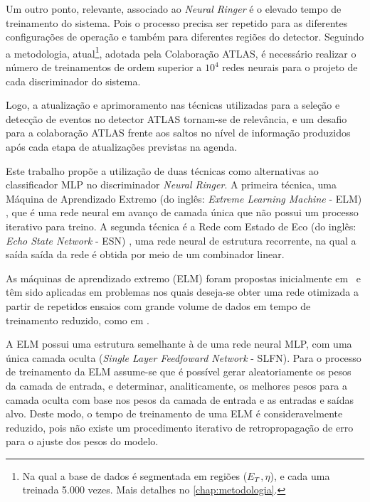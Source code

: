 Um outro ponto, relevante, associado ao \emph{Neural Ringer} é o elevado tempo de treinamento do sistema. Pois o processo precisa ser repetido para as diferentes configurações de operação e também para diferentes regiões do detector. Seguindo a metodologia, atual\footnote{Na qual a base de dados é segmentada em regiões ($E_T\,,\eta$), e cada uma treinada 5.000 vezes. Mais detalhes no \autoref{chap:metodologia}.}, adotada pela Colaboração ATLAS, é necessário realizar o número de treinamentos de ordem superior a $10^4$ redes neurais para o projeto de cada discriminador do sistema. 

Logo, a atualização e aprimoramento nas técnicas utilizadas para a seleção e detecção de eventos no detector ATLAS tornam-se de relevância, e um desafio para a colaboração ATLAS frente aos saltos no nível de informação produzidos após cada etapa de atualizações previstas na agenda.

Este trabalho propõe a utilização de duas técnicas como alternativas ao classificador MLP no discriminador \emph{Neural Ringer}. A primeira técnica, uma Máquina de Aprendizado Extremo (do inglês: \emph{Extreme Learning Machine} - ELM) \cite{huang2006, huang2011, gaohuang2015, huang2015}, que é uma rede neural em avanço de camada única que não possui um processo iterativo para treino. A segunda técnica é a Rede com Estado de Eco (do inglês: \emph{Echo State Network} - ESN) \cite{jaeger2003, jaeger2004, jaeger2010}, uma rede neural de estrutura recorrente, na qual a saída saída da rede é obtida por meio de um combinador linear.


As máquinas de aprendizado extremo (ELM) foram propostas inicialmente em~ e têm sido aplicadas em problemas nos quais deseja-se obter uma rede otimizada a partir de repetidos ensaios com grande volume de dados em tempo de treinamento reduzido, como em  . 

A ELM possui uma estrutura semelhante à de uma rede neural MLP, com uma única camada oculta (\textit{Single Layer Feedfoward Network} - SLFN). Para o processo de treinamento da ELM assume-se que é possível  gerar aleatoriamente os pesos da camada de entrada, e determinar, analiticamente, os melhores pesos para a camada oculta \cite{huang2015} com base nos pesos da camada de entrada e as entradas e saídas alvo. Deste modo, o tempo de treinamento de uma ELM é consideravelmente reduzido, pois não existe um procedimento iterativo de retropropagação de erro para o ajuste dos pesos do modelo.

